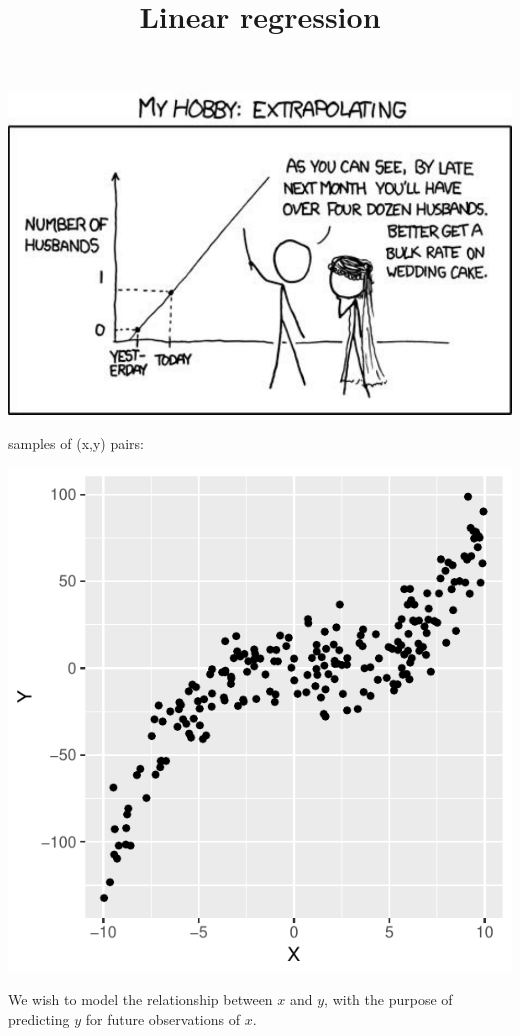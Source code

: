 

\title[Linear regression]{Linear regression}



\begin{frame}

\begin{center}
\includegraphics[width=0.90\linewidth]{../LectureAssets/L04/Lecture04cartoon}
\end{center}

\end{frame}



\begin{frame}
\begin{analysis}
 samples of (x,y) pairs:
\smallskip
\begin{center}
\includegraphics[width=0.40\linewidth]{../LectureAssets/L04/SimpleReg01}
\end{center}
\smallskip
We wish to model the relationship between $x$ and $y$, with the purpose of predicting $y$ for future observations of $x$.
\smallskip
\end{analysis}
\end{frame}

